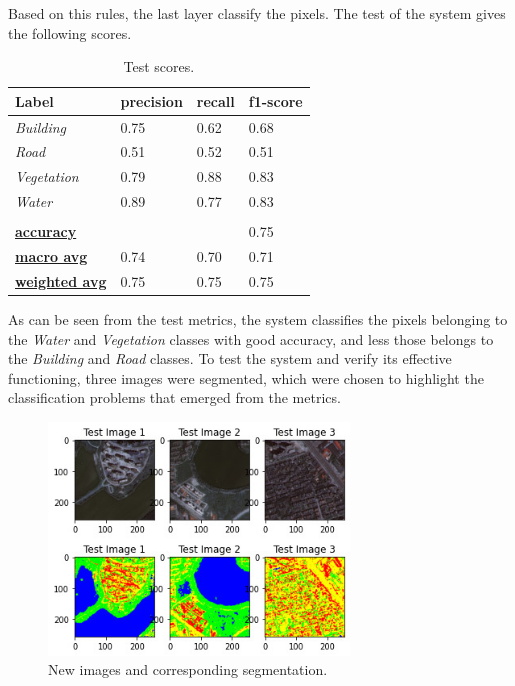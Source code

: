 \documentclass[10pt,twocolumn,letterpaper]{article}
\begin{document}
Based on this rules, the last layer classify the pixels. The test of the system gives the following scores.
\begin{table}[]
\centering
\caption{Test scores.}
\begin{tabular}{|l|l|l|l|}
\hline
\textbf{Label}              & \textbf{precision} & \textbf{recall} & \textbf{f1-score} \\ \hline
\textit{Building}           & 0.75               & 0.62            & 0.68              \\ \hline
\textit{Road}               & 0.51               & 0.52            & 0.51              \\ \hline
\textit{Vegetation}         & 0.79               & 0.88            & 0.83              \\ \hline
\textit{Water}              & 0.89               & 0.77            & 0.83              \\ \hline
                            &                    &                 &                   \\ \hline
{\ul \textbf{accuracy}}     &                    &                 & 0.75              \\ \hline
{\ul \textbf{macro avg}}    & 0.74               & 0.70            & 0.71              \\ \hline
{\ul \textbf{weighted avg}} & 0.75               & 0.75            & 0.75              \\ \hline
\end{tabular}
\end{table}

As can be seen from the test metrics, the system classifies the pixels belonging to the \textit{Water} and \textit{Vegetation} classes with good accuracy, and less those belongs to the \textit{Building} and \textit{Road} classes. To test the system and verify its effective functioning, three images were segmented, which were chosen to highlight the classification problems that emerged from the metrics.

\begin{figure}[h]
\includegraphics[width=8cm]{images/image.jpg}
\caption{New images and corresponding segmentation.}
\end{figure}
\end{document}

